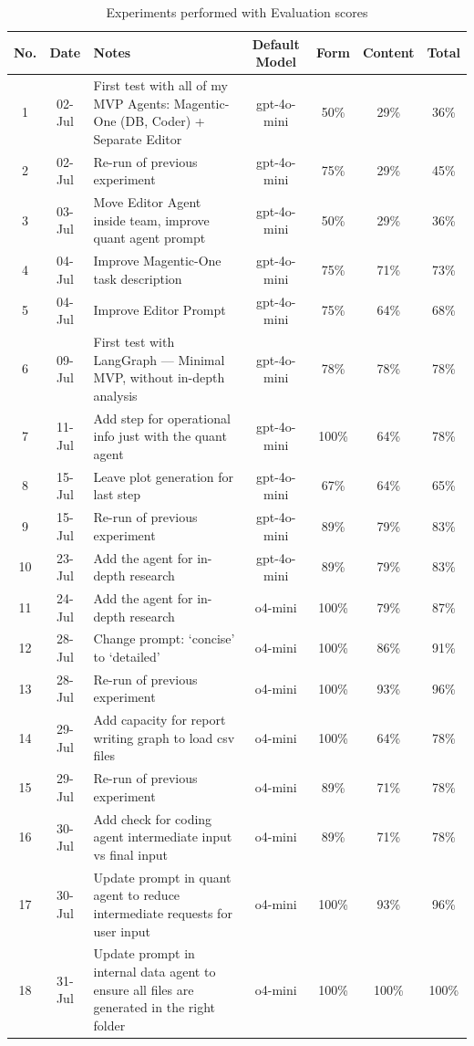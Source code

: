 \documentclass[a4paper]{report}
\begin{document}
\begin{table}[H]
\centering
\begin{tabular}{|c|c|p{7cm}|c|c|c|c|}
    \hline
    No. & Date & Notes & Default Model & Form & Content & Total \\ \hline
    1 & 02-Jul & First test with all of my MVP Agents: Magentic-One (DB, Coder) + Separate Editor & gpt-4o-mini & 50\% & 29\% & 36\% \\ \hline
    2 & 02-Jul & Re-run of previous experiment & gpt-4o-mini & 75\% & 29\% & 45\% \\ \hline
    3 & 03-Jul & Move Editor Agent inside team, improve quant agent prompt & gpt-4o-mini & 50\% & 29\% & 36\% \\ \hline
    4 & 04-Jul & Improve Magentic-One task description & gpt-4o-mini & 75\% & 71\% & 73\% \\ \hline
    5 & 04-Jul & Improve Editor Prompt & gpt-4o-mini & 75\% & 64\% & 68\% \\ \hline
    6 & 09-Jul & First test with LangGraph --- Minimal MVP, without in-depth analysis & gpt-4o-mini & 78\% & 78\% & 78\% \\ \hline
    7 & 11-Jul & Add step for operational info just with the quant agent & gpt-4o-mini & 100\% & 64\% & 78\% \\ \hline
    8 & 15-Jul & Leave plot generation for last step & gpt-4o-mini & 67\% & 64\% & 65\% \\ \hline
    9 & 15-Jul & Re-run of previous experiment & gpt-4o-mini & 89\% & 79\% & 83\% \\ \hline
    10 & 23-Jul & Add the agent for in-depth research & gpt-4o-mini & 89\% & 79\% & 83\% \\ \hline
    11 & 24-Jul & Add the agent for in-depth research & o4-mini & 100\% & 79\% & 87\% \\ \hline
    12 & 28-Jul & Change prompt: `concise' to `detailed' & o4-mini & 100\% & 86\% & 91\% \\ \hline
    13 & 28-Jul & Re-run of previous experiment & o4-mini & 100\% & 93\% & 96\% \\ \hline
    14 & 29-Jul & Add capacity for report writing graph to load csv files & o4-mini & 100\% & 64\% & 78\% \\ \hline
    15 & 29-Jul & Re-run of previous experiment & o4-mini & 89\% & 71\% & 78\% \\ \hline
    16 & 30-Jul & Add check for coding agent intermediate input vs final input & o4-mini & 89\% & 71\% & 78\% \\ \hline
    17 & 30-Jul & Update prompt in quant agent to reduce intermediate requests for user input & o4-mini & 100\% & 93\% & 96\% \\ \hline
    18 & 31-Jul & Update prompt in internal data agent to ensure all files are generated in the right folder & o4-mini & 100\% & 100\% & 100\% \\ \hline
    \end{tabular}
\caption{Experiments performed with Evaluation scores}
\end{table}
\end{document}
